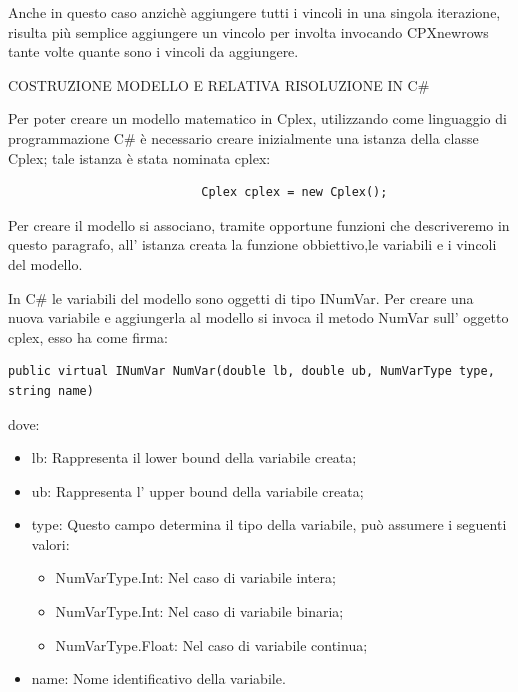 \documentclass[11pt]{article}
\begin{document}
Anche in questo caso anzich\`e aggiungere tutti i vincoli in una singola iterazione, risulta pi\`u semplice aggiungere un vincolo per involta invocando  CPXnewrows tante volte quante sono i vincoli da aggiungere.

\vspace{2\baselineskip}
COSTRUZIONE MODELLO E RELATIVA RISOLUZIONE IN C\#
\vspace{2\baselineskip}

Per poter creare un modello matematico in Cplex, utilizzando come linguaggio di programmazione C\# \`e necessario creare inizialmente una istanza della classe Cplex; tale istanza \`e stata nominata cplex: 

\begin{lstlisting}
                           Cplex cplex = new Cplex();
\end{lstlisting}

Per creare il modello si associano, tramite opportune funzioni che descriveremo in questo paragrafo, all' istanza creata la funzione obbiettivo,le variabili e i vincoli del modello. 

In C\# le variabili del modello sono oggetti di tipo INumVar. Per creare una nuova variabile e aggiungerla al modello si invoca il metodo NumVar sull' oggetto cplex, esso ha come firma:

\begin{lstlisting}
public virtual INumVar NumVar(double lb, double ub, NumVarType type, string name)
\end{lstlisting}

dove:

\begin{itemize}
\item  lb: Rappresenta il lower bound della variabile creata;
\item ub: Rappresenta l' upper bound della variabile creata;
\item type: Questo campo determina il tipo della variabile, pu\`o assumere i seguenti valori:
\begin{itemize}
\item NumVarType.Int: Nel caso di variabile intera;
\item NumVarType.Int: Nel caso di variabile binaria;
\item NumVarType.Float: Nel caso di variabile continua;
\end{itemize}
\item name: Nome identificativo della variabile.
\end{itemize}
\end{document}
